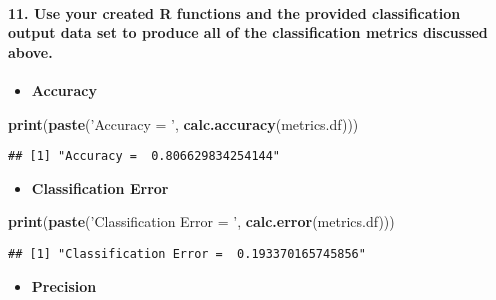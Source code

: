 \documentclass[]{article}
\newenvironment{Shaded}{\begin{snugshade}}{\end{snugshade}}
\newcommand{\KeywordTok}[1]{\textcolor[rgb]{0.13,0.29,0.53}{\textbf{#1}}}
\newcommand{\NormalTok}[1]{#1}
\newcommand{\StringTok}[1]{\textcolor[rgb]{0.31,0.60,0.02}{#1}}
\providecommand{\tightlist}{%
  \setlength{\itemsep}{0pt}\setlength{\parskip}{0pt}}
\let\oldparagraph\paragraph
\renewcommand{\paragraph}[1]{\oldparagraph{#1}\mbox{}}
\begin{document}
\hypertarget{use-your-created-r-functions-and-the-provided-classification-output-data-set-to-produce-all-of-the-classification-metrics-discussed-above.}{%
\paragraph{11. Use your created R functions and the provided
classification output data set to produce all of the classification
metrics discussed
above.}\label{use-your-created-r-functions-and-the-provided-classification-output-data-set-to-produce-all-of-the-classification-metrics-discussed-above.}}

\begin{itemize}
\tightlist
\item
  \textbf{Accuracy}
\end{itemize}

\begin{Shaded}
\begin{Highlighting}[]
\KeywordTok{print}\NormalTok{(}\KeywordTok{paste}\NormalTok{(}\StringTok{'Accuracy = '}\NormalTok{, }\KeywordTok{calc.accuracy}\NormalTok{(metrics.df)))}
\end{Highlighting}
\end{Shaded}

\begin{verbatim}
## [1] "Accuracy =  0.806629834254144"
\end{verbatim}

\begin{itemize}
\tightlist
\item
  \textbf{Classification Error}
\end{itemize}

\begin{Shaded}
\begin{Highlighting}[]
\KeywordTok{print}\NormalTok{(}\KeywordTok{paste}\NormalTok{(}\StringTok{'Classification Error = '}\NormalTok{, }\KeywordTok{calc.error}\NormalTok{(metrics.df)))}
\end{Highlighting}
\end{Shaded}

\begin{verbatim}
## [1] "Classification Error =  0.193370165745856"
\end{verbatim}

\begin{itemize}
\tightlist
\item
  \textbf{Precision}
\end{itemize}
\end{document}
